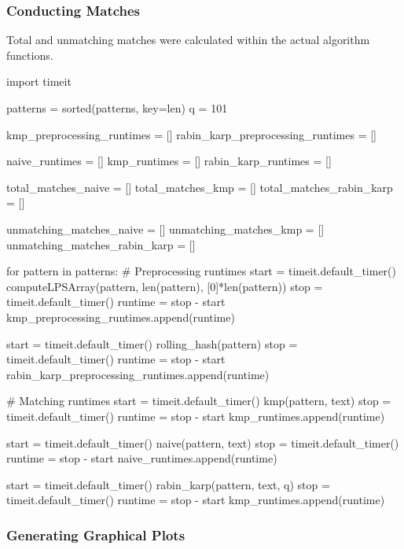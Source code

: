 \documentclass[12pt]{article}
\begin{document}
\subsubsection{Conducting Matches}
Total and unmatching matches were calculated within the actual algorithm functions.

\begin{singlespace}
\begin{python}
import timeit

patterns = sorted(patterns, key=len)
q = 101

kmp_preprocessing_runtimes = []
rabin_karp_preprocessing_runtimes = []

naive_runtimes = []
kmp_runtimes = []
rabin_karp_runtimes = []

total_matches_naive = []
total_matches_kmp = []
total_matches_rabin_karp = []

unmatching_matches_naive = []
unmatching_matches_kmp = []
unmatching_matches_rabin_karp = []

for pattern in patterns:
	# Preprocessing runtimes
	start = timeit.default_timer()
	computeLPSArray(pattern, len(pattern), [0]*len(pattern))
	stop = timeit.default_timer()
	runtime = stop - start
	kmp_preprocessing_runtimes.append(runtime)

	start = timeit.default_timer()
	rolling_hash(pattern)
	stop = timeit.default_timer()
	runtime = stop - start
	rabin_karp_preprocessing_runtimes.append(runtime)

	# Matching runtimes
	start = timeit.default_timer()
	kmp(pattern, text)
	stop = timeit.default_timer()
	runtime = stop - start
	kmp_runtimes.append(runtime)

	start = timeit.default_timer()
	naive(pattern, text)
	stop = timeit.default_timer()
	runtime = stop - start
	naive_runtimes.append(runtime)

	start = timeit.default_timer()
	rabin_karp(pattern, text, q)
	stop = timeit.default_timer()
	runtime = stop - start
	kmp_runtimes.append(runtime)

\end{python}
\end{singlespace}

\subsubsection{Generating Graphical Plots}
\end{document}
